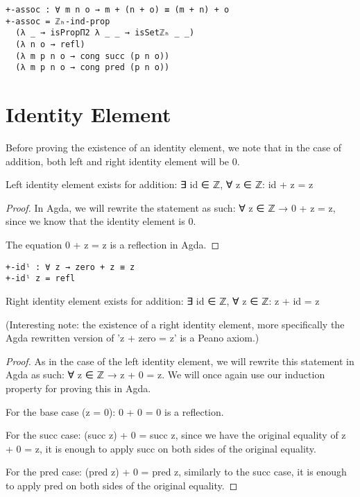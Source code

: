 \begin{listing}[H]
\begin{verbatim}
+-assoc : ∀ m n o → m + (n + o) ≡ (m + n) + o
+-assoc = ℤₕ-ind-prop
  (λ _ → isPropΠ2 λ _ _ → isSetℤₕ _ _)
  (λ n o → refl)
  (λ m p n o → cong succ (p n o))
  (λ m p n o → cong pred (p n o))
\end{verbatim}
\caption{Agda proof of addition being associative}
\end{listing}

\section{Identity Element}
Before proving the existence of an identity element, we note that in the case of addition, both left and right identity element will be 0.
\begin{theorem}
  Left identity element exists for addition: ∃ id ∈ ℤ, ∀ z ∈ ℤ: id + z = z
\end{theorem}

\begin{proof}
  In Agda, we will rewrite the statement as such: ∀ z ∈ ℤ → 0 + z = z, since we know that the identity element is 0.

  The equation 0 + z = z is a reflection in Agda.
\end{proof}

\begin{listing}[H]
\begin{verbatim}
+-idˡ : ∀ z → zero + z ≡ z
+-idˡ z = refl
\end{verbatim}
\caption{Agda proof of addition having a left identity element}
\end{listing}

\begin{theorem}
  Right identity element exists for addition: ∃ id ∈ ℤ, ∀ z ∈ ℤ: z + id = z
\end{theorem}
(Interesting note: the existence of a right identity element, more specifically the Agda rewritten version of 'z + zero = z' is a Peano axiom\cite{peano}.)

\begin{proof}
  As in the case of the left identity element, we will rewrite this statement in Agda as such: ∀ z ∈ ℤ → z + 0 = z. We will once again use our induction property for proving this in Agda.

  For the base case (z = 0): 0 + 0 = 0 is a reflection.

  For the succ case: (succ z) + 0 = succ z, since we have the original equality of z + 0 = z, it is enough to apply succ on both sides of the original equality.

  For the pred case: (pred z) + 0 = pred z, similarly to the succ case, it is enough to apply pred on both sides of the original equality.
\end{proof}

